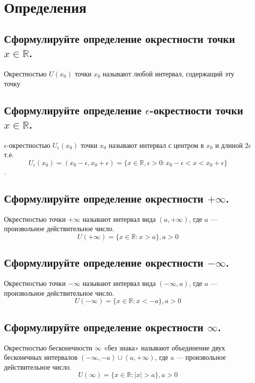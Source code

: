 \documentclass[a4paper, 10pt]{article}
\begin{document}
\section{Определения}
    \subsection{Сформулируйте определение окрестности точки $x \in \mathbb{R}$.}

    Окрестностью $U(x_0)$ точки $x_0$ называют любой интервал, содержащий эту точку

    \subsection{Сформулируйте определение $\epsilon$-окрестности точки $x \in \mathbb{R}$. }

    $\epsilon$-окрестностью $U_\epsilon(x_0)$ точки $x_0$ называют интервал с центром в 
    $x_0$ и длиной $2\epsilon$ т.е. $$U_\epsilon(x_0) = (x_0 - \epsilon, x_0 + \epsilon) = 
    \{x \in \mathbb{R},  \epsilon>0 : x_0 - \epsilon < x < x_0 + \epsilon\}$$.

    \subsection{Сформулируйте определение окрестности $+\infty$. }

    Окрестностью точки $+\infty$ называют интервал вида $(a, +\infty)$, где $a$ — произвольное действительное число.
    $$U(+\infty) = \{x \in \mathbb{R}: x > a\}, a > 0$$

    \subsection{Сформулируйте определение окрестности $-\infty$. }

    Окрестностью точки $-\infty$ называют интервал вида $(-\infty, a)$, где $a$ — произвольное действительное число.
    $$U(-\infty) = \{x \in \mathbb{R}: x < -a\}, a > 0$$

    \subsection{Сформулируйте определение окрестности $\infty$. }

    Окрестностью бесконечности $\infty$ «без знака»  называют объединение двух бесконечных интервалов 
    $(-\infty, -a) \cup (a, +\infty)$, где a — произвольное действительное число.
    $$U(\infty) = \{x \in \mathbb{R}: |x| > a\}, a > 0$$
\end{document}
